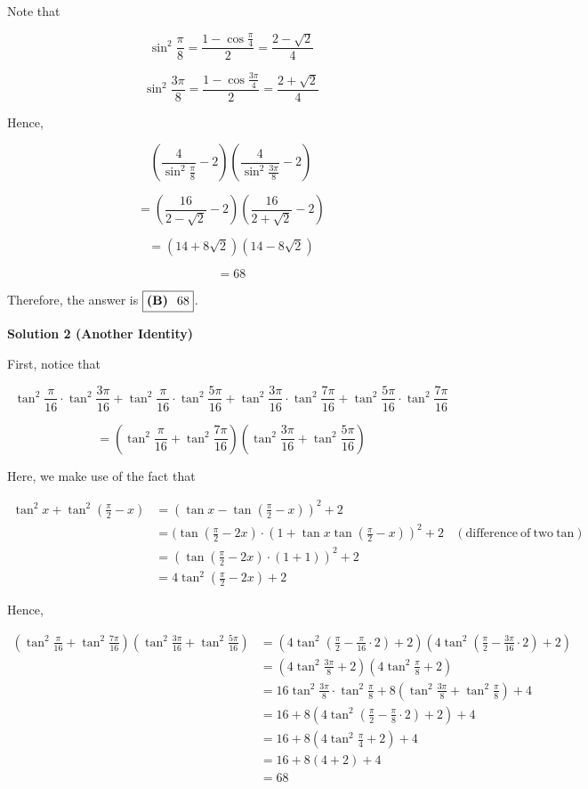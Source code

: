 \begin{enumerate}
 Note that 

 
 \[\sin^2 \frac{\pi}{8}=\frac{1-\cos \frac{\pi}{4}}{2}=\frac{2-\sqrt{2}}{4}\]

 \[\sin^2 \frac{3\pi}{8}=\frac{1-\cos \frac{3\pi}{4}}{2}=\frac{2+\sqrt{2}}{4}\]

 Hence,

 
 \[\left(\frac{4}{\sin^2 \frac{\pi}{8}}-2\right)\left(\frac{4}{\sin^2 \frac{3\pi}{8}}-2\right)\]

 \[=\left(\frac{16}{2-\sqrt{2}}-2\right)\left(\frac{16}{2+\sqrt{2}}-2\right)\]

 \[=(14+8\sqrt{2})(14-8\sqrt{2})\]

 \[=68\]

 Therefore, the answer is $\fbox{\textbf{(B) } 68}$.

 



\textbf{Solution 2 (Another Identity)}

First, notice that

 
 \[\tan^2 \frac {\pi}{16} \cdot \tan^2 \frac {3\pi}{16} + \tan^2 \frac {\pi}{16} \cdot \tan^2 \frac {5\pi}{16}+\tan^2 \frac {3\pi}{16} \cdot \tan^2 \frac {7\pi}{16}+\tan^2 \frac {5\pi}{16} \cdot \tan^2 \frac {7\pi}{16}\]

 \[=(\tan^2\frac{\pi}{16}+\tan^2 \frac{7\pi}{16})(\tan^2\frac{3\pi}{16}+\tan^2 \frac{5\pi}{16})\]

 
Here, we make use of the fact that

 
 \begin{align*} \tan^2 x+\tan^2 (\frac{\pi}{2}-x) &= (\tan x - \tan (\frac{\pi}{2} - x))^2 + 2\\ &= (\tan (\frac{\pi}{2} - 2x) \cdot (1 + \tan x \tan (\frac{\pi}{2} - x))^2 + 2~~~~(\mathrm{difference~of~two~tan})\\ &= (\tan (\frac{\pi}{2} - 2x) \cdot (1 + 1))^2 + 2\\ &= 4\tan^2 (\frac{\pi}{2} - 2x) + 2 \end{align*}


 Hence,

 
 \begin{align*} (\tan^2\frac{\pi}{16}+\tan^2 \frac{7\pi}{16})(\tan^2\frac{3\pi}{16}+\tan^2 \frac{5\pi}{16}) &= (4\tan^2 (\frac{\pi}{2} - \frac{\pi}{16} \cdot 2) + 2)(4\tan^2 (\frac{\pi}{2} - \frac{3\pi}{16} \cdot 2) + 2)\\ &= (4\tan^2 \frac{3\pi}{8} + 2)(4\tan^2 \frac{\pi}{8} + 2)\\ &= 16\tan^2 \frac{3\pi}{8} \cdot \tan^2 \frac{\pi}{8} + 8(\tan^2 \frac{3\pi}{8} + \tan^2 \frac{\pi}{8}) + 4\\ &= 16 + 8(4\tan^2 (\frac{\pi}{2} - \frac{\pi}{8} \cdot 2) + 2) + 4\\ &= 16 + 8(4\tan^2 \frac{\pi}{4} + 2) + 4\\ &= 16 + 8(4 + 2) + 4\\ &= 68 \end{align*}



\end{enumerate}
